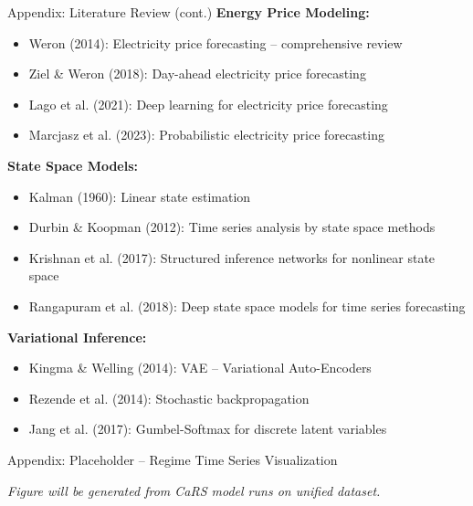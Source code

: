 \documentclass[aspectratio=169]{beamer}
\begin{document}
\begin{frame}{Appendix: Literature Review (cont.)}
\textbf{Energy Price Modeling:}
\begin{itemize}
    \item Weron (2014): Electricity price forecasting -- comprehensive review
    \item Ziel \& Weron (2018): Day-ahead electricity price forecasting
    \item Lago et al. (2021): Deep learning for electricity price forecasting
    \item Marcjasz et al. (2023): Probabilistic electricity price forecasting
\end{itemize}

\vspace{0.3cm}
\textbf{State Space Models:}
\begin{itemize}
    \item Kalman (1960): Linear state estimation
    \item Durbin \& Koopman (2012): Time series analysis by state space methods
    \item Krishnan et al. (2017): Structured inference networks for nonlinear state space
    \item Rangapuram et al. (2018): Deep state space models for time series forecasting
\end{itemize}

\vspace{0.3cm}
\textbf{Variational Inference:}
\begin{itemize}
    \item Kingma \& Welling (2014): VAE -- Variational Auto-Encoders
    \item Rezende et al. (2014): Stochastic backpropagation
    \item Jang et al. (2017): Gumbel-Softmax for discrete latent variables
\end{itemize}
\end{frame}

\begin{frame}{Appendix: Placeholder -- Regime Time Series Visualization}
\begin{center}
\end{center}

{\scriptsize \textit{Figure will be generated from CaRS model runs on unified dataset.}}
\end{frame}
\end{document}
